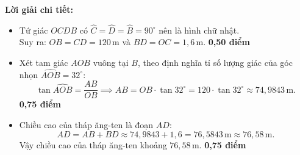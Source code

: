 \documentclass[12pt,a4paper]{article}
\begin{document}
\vspace{1mm}
\noindent\textbf{Lời giải chi tiết:}
\begin{itemize}[leftmargin=16pt, itemsep=2.5pt, parsep=0pt]
  \item Tứ giác $OCDB$ có $\widehat{C} = \widehat{D} = \widehat{B} = 90^\circ$ nên là hình chữ nhật.\\
  Suy ra: $OB = CD = 120\,\text{m}$ và $BD = OC = 1{,}6\,\text{m}$. \dotfill \textbf{0,50 điểm}
  \item Xét tam giác $AOB$ vuông tại $B$, theo định nghĩa tỉ số lượng giác của góc nhọn $\widehat{AOB} = 32^\circ$:
  \[
    \tan \widehat{AOB} = \frac{AB}{OB} \implies AB = OB \cdot \tan 32^\circ = 120 \cdot \tan 32^\circ \approx 74{,}9843\,\text{m}.
  \] \dotfill \textbf{0,75 điểm}
  \item Chiều cao của tháp ăng-ten là đoạn $AD$:
  \[
    AD = AB + BD \approx 74{,}9843 + 1{,}6 = 76{,}5843\,\text{m} \approx 76{,}58\,\text{m}.
  \]
  Vậy chiều cao của tháp ăng-ten khoảng $76{,}58\,\text{m}$. \dotfill \textbf{0,75 điểm}
\end{itemize}

\newpage
\end{document}
